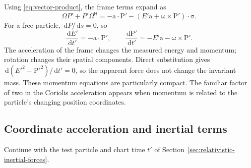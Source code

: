 \documentclass[11pt]{article}
\newcommand{\pv}[1]{{#1}}
\newcommand{\pvGreek}[1]{{#1}}
\newcommand{\vstyle}[1]{{\bm{\mathrm{#1}}}}
\newcommand{\pP}{\pv{P}}
\newcommand{\pvOmega}{\pvGreek{\Omega}}
\numberwithin{equation}{section}
\newcommand{\dotprod}{\cdot}
\newcommand{\bsig}{\vstyle{\sigma}}
\newcommand{\ba}{\vstyle{a}}
\newcommand{\bp}{\vstyle{P}}
\newcommand{\dd}{\,\mathrm d}
\begin{document}
Using \eqref{eq:vector-product}, the frame terms expand as
\[
 \pvOmega\pP'+\pP'\pvOmega^{\mathsf H}
 =-\ba\dotprod\bp'
  -(E'\ba+\vstyle{\omega}\times\bp')\dotprod\bsig.
\]
For a free particle, $\dd\pP/\dd s=0$, so
\begin{equation}
 \boxed{\frac{\dd E'}{\dd t'}=-\ba\dotprod\bp',\qquad
 \frac{\dd\bp'}{\dd t'}=-E'\ba-\vstyle{\omega}\times\bp'.}
 \label{eq:moving-frame-free-momentum}
\end{equation}
The acceleration of the frame changes the measured energy and momentum;
rotation changes their spatial components. Direct substitution gives
$\dd(E'^2-\bp'^2)/\dd t'=0$, so the apparent force does not change the
invariant mass. These momentum equations are particularly compact.
The familiar factor of two in the Coriolis acceleration appears when
momentum is related to the particle's changing position coordinates.

\subsection{Coordinate acceleration and inertial terms}
\label{sec:coordinate-inertial-forces}

Continue with the test particle and chart time $t'$ of
Section~\ref{sec:relativistic-inertial-forces}.
\end{document}
